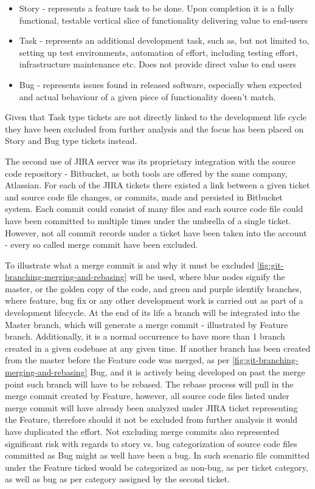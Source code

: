 \begin{itemize}
    \item Story - represents a feature task to be done. Upon completion it is a fully functional, testable vertical slice of functionality delivering value to end-users
    \item Task - represents an additional development task, such as, but not limited to, setting up test environments, automation of effort, including testing effort, infrastructure maintenance etc. Does not provide direct value to end users
    \item Bug - represents issues found in released software, especially when expected and actual behaviour of a given piece of functionality doesn't match.
\end{itemize}
Given that Task type tickets are not directly linked to the development life cycle they have been excluded from further analysis and the focus has been placed on Story and Bug type tickets instead.

The second use of JIRA server was its proprietary integration with the source code repository - Bitbucket, as both tools are offered by the same company, Atlassian. For each of the JIRA tickets there existed a link between a given ticket and source code file changes, or commits, made and persisted in Bitbucket system. 
Each commit could consist of many files and each source code file could have been committed to multiple times under the umbrella of a single ticket. However, not all commit records under a ticket have been taken into the account - every so called merge commit have been excluded.

To illustrate what a merge commit is and why it must be excluded \ref{fig:git-branching-merging-and-rebasing} will be used, where blue nodes signify the master, or the golden copy of the code, and green and purple identify branches, where feature, bug fix or any other development work is carried out as part of a development lifecycle. At the end of its life a branch will be integrated into the Master branch, which will generate a merge commit - illustrated by Feature branch. Additionally, it is a normal occurrence to have more than 1 branch created in a given codebase at any given time. If another branch has been created from the master before the Feature code was merged, as per \ref{fig:git-branching-merging-and-rebasing} Bug, and it is actively being developed on past the merge point such branch will have to be rebased. The rebase process will pull in the merge commit created by Feature, however, all source code files listed under merge commit will have already been analyzed under JIRA ticket representing the Feature, therefore should it not be excluded from further analysis it would have duplicated the effort. Not excluding merge commits also represented significant risk with regards to story vs. bug categorization of source code files committed as Bug might as well have been a bug. In such scenario file committed under the Feature ticked would be categorized as non-bug, as per ticket category, as well as bug as per category assigned by the second ticket.

